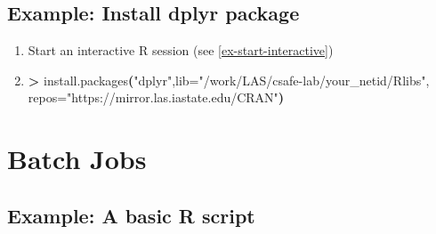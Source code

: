 \documentclass[
]{book}
\newenvironment{Shaded}{\begin{snugshade}}{\end{snugshade}}
\newcommand{\ExtensionTok}[1]{#1}
\newcommand{\KeywordTok}[1]{\textcolor[rgb]{0.13,0.29,0.53}{\textbf{#1}}}
\newcommand{\NormalTok}[1]{#1}
\newcommand{\OperatorTok}[1]{\textcolor[rgb]{0.81,0.36,0.00}{\textbf{#1}}}
\newcommand{\StringTok}[1]{\textcolor[rgb]{0.31,0.60,0.02}{#1}}
\begin{document}
\hypertarget{ex-interactive-install}{%
\subsection{Example: Install dplyr package}\label{ex-interactive-install}}

\begin{enumerate}
\def\labelenumi{\arabic{enumi}.}
\item
  Start an interactive R session (see \ref{ex-start-interactive})
\item
\begin{Shaded}
\begin{Highlighting}[]
\OperatorTok{\textgreater{}}\NormalTok{ install.packages}\KeywordTok{(}\StringTok{"dplyr"}\ExtensionTok{,lib=}\StringTok{"/work/LAS/csafe{-}lab/your\_netid/Rlibs"}\ExtensionTok{,}\NormalTok{ repos=}\StringTok{"https://mirror.las.iastate.edu/CRAN"}\KeywordTok{)}
\end{Highlighting}
\end{Shaded}
\end{enumerate}

\hypertarget{batch-jobs}{%
\section{Batch Jobs}\label{batch-jobs}}

\hypertarget{ex-basic}{%
\subsection{Example: A basic R script}\label{ex-basic}}
\end{document}
